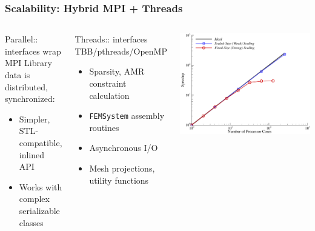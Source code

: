 \documentclass[mathserif]{beamer}
\begin{document}
\begin{frame}
\frametitle{Scalability: Hybrid MPI + Threads}

\begin{columns}
\begin{block}{Parallel:: interfaces wrap MPI}
Library data is distributed, synchronized:
\begin{itemize}
	\item Simpler, STL-compatible, inlined API
	\item Works with complex serializable classes
\end{itemize}
\end{block}

\begin{block}{Threads:: interfaces TBB/pthreads/OpenMP}
\begin{itemize}
	\item Sparsity, AMR constraint calculation
	\item {\texttt{FEMSystem}} assembly routines
	\item Asynchronous I/O
	\item Mesh projections, utility functions
\end{itemize}
\end{block}

\center
\includegraphics[width=.8\textwidth]{fins_speedup}


\end{columns}
\end{frame}
\end{document}
